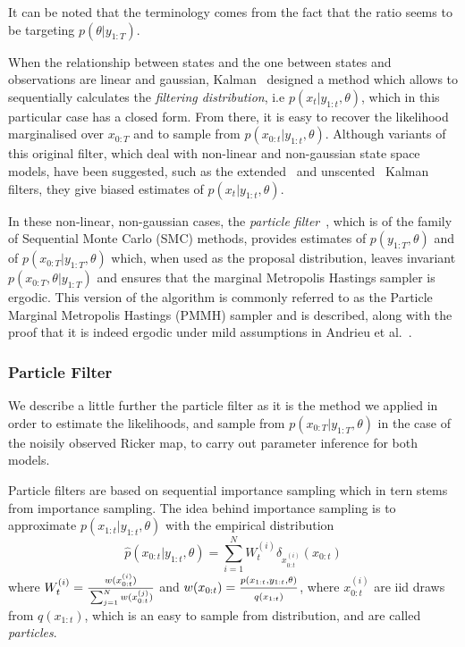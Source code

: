 \documentclass[12pt]{article}
\begin{document}
	It can be noted that the terminology comes from the fact that the ratio seems to be targeting $p(\theta | y_{1:T})$.
	
 	When the relationship between states and the one between states and observations are linear and gaussian, Kalman~\cite{Kalman1960} designed a method which allows to sequentially calculates the \emph{filtering distribution}, i.e $p(x_{t}| y_{1:t}, \theta)$, which in this particular case has a closed form. From there, it is easy to recover the likelihood marginalised over $x_{0:T}$ and to sample from $p(x_{0:t}| y_{1:t}, \theta)$. Although variants of this original filter, which deal with non-linear and non-gaussian state space models, have been suggested, such as the extended~\cite{McElhoe1966} and unscented~\cite{Julier1997} Kalman filters, they give biased estimates of $p(x_t|y_{1:t}, \theta)$. 
 	
 	In these non-linear, non-gaussian cases, the \emph{particle filter}~\cite{Gordon1993}, which is of the family of Sequential Monte Carlo (SMC) methods, provides estimates of $p(y_{1:T}, \theta)$ and of $p(x_{0:T}|y_{1:T}, \theta)$ which, when used as the proposal distribution, leaves invariant $p(x_{0:T}, \theta|y_{1:T})$ and ensures that the marginal Metropolis Hastings sampler is ergodic. This version of the algorithm is commonly referred to as the Particle Marginal Metropolis Hastings (PMMH) sampler and is described, along with the proof that it is indeed ergodic under mild assumptions in Andrieu et al.~\cite{andrieu2010particle}.
	
	\subsubsection{Particle Filter}
	We describe a little further the particle filter as it is the method we applied in order to estimate the likelihoods, and sample from $p(x_{0:T}|y_{1:T}, \theta)$ in the case of the noisily observed Ricker map, to carry out parameter inference for both models.
	
	Particle filters are based on sequential importance sampling which in tern stems from importance sampling.
	The idea behind importance sampling is to approximate $p(x_{1:t}|y_{1:t}, \theta)$ with the empirical distribution
	\begin{equation}
	\hat{p}(x_{0:t}|y_{1:t}, \theta) = \sum_{i=1}^{N}W_t^{(i)} \delta_{x_{0:t}^{(i)}}(x_{0:t})
	\end{equation}
	where $W_t^{(i)} = \frac{\strut w(x_{0:t}^{(i)})}{\strut \sum_{j=1}^{N} w(x_{0:t}^{(j)})}$ and $w(x_{0:t}) = \frac{\strut p(x_{1:t},y_{1:t}, \theta)}{\strut q(x_{1:t})}$, where $x_{0:t}^{(i)}$ are iid draws from $q(x_{1:t})$, which is an easy to sample from distribution, and are called \emph{particles}.
	
\end{document}
